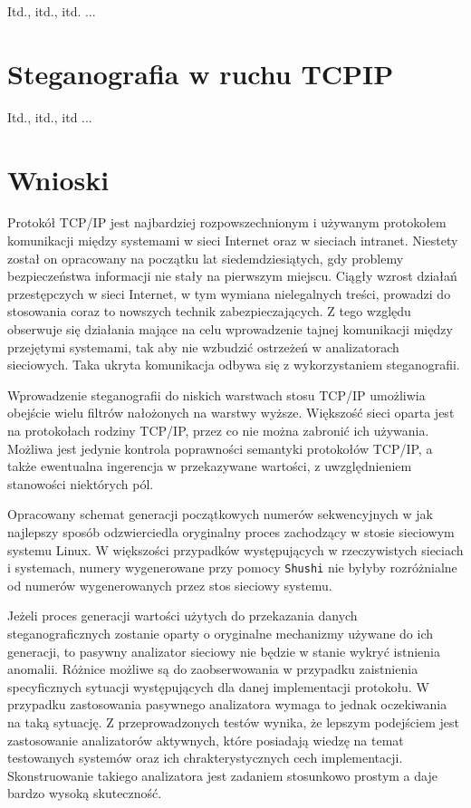 \documentclass[a4paper,12pt,twoside,openany]{report}
\newcommand{\tech}{\texttt}
\begin{document}
Itd., itd., itd. ...

\chapter{Steganografia w ruchu TCPIP}
\label{chapterSteganografiaWRuchuTCPIP}

Itd., itd., itd ...

\chapter{Wnioski}

Protokół TCP/IP jest najbardziej rozpowszechnionym i używanym protokołem 
komunikacji między systemami w sieci Internet oraz w sieciach intranet. Niestety 
został on opracowany na początku lat siedemdziesiątych, gdy problemy 
bezpieczeństwa informacji nie stały na pierwszym miejscu. Ciągły wzrost działań 
przestępczych w sieci Internet, w tym wymiana nielegalnych treści, prowadzi do 
stosowania coraz to nowszych technik zabezpieczających. Z tego względu obserwuje 
się działania mające na celu wprowadzenie tajnej komunikacji między przejętymi 
systemami, tak aby nie wzbudzić ostrzeżeń w analizatorach sieciowych. Taka 
ukryta komunikacja odbywa się z wykorzystaniem steganografii.

Wprowadzenie steganografii do niskich warstwach stosu TCP/IP umożliwia obejście 
wielu filtrów nałożonych na warstwy wyższe. Większość sieci oparta jest na 
protokołach rodziny TCP/IP, przez co nie można zabronić ich używania. Możliwa 
jest jedynie kontrola poprawności semantyki protokołów TCP/IP, a także 
ewentualna ingerencja w przekazywane wartości, z uwzględnieniem stanowości 
niektórych pól.

Opracowany schemat generacji początkowych numerów sekwencyjnych w jak najlepszy 
sposób odzwierciedla oryginalny proces zachodzący w stosie sieciowym systemu 
Linux. W większości przypadków występujących w rzeczywistych sieciach i 
systemach, numery wygenerowane przy pomocy \tech{Shushi} nie byłyby rozróżnialne 
od numerów wygenerowanych przez stos sieciowy systemu.

Jeżeli proces generacji wartości użytych do przekazania danych 
steganograficznych zostanie oparty o oryginalne mechanizmy używane do ich 
generacji, to pasywny analizator sieciowy nie będzie w stanie wykryć istnienia 
anomalii. Różnice możliwe są do zaobserwowania w przypadku zaistnienia 
specyficznych sytuacji występujących dla danej implementacji protokołu. W 
przypadku zastosowania pasywnego analizatora wymaga to jednak oczekiwania na 
taką sytuację. Z przeprowadzonych testów wynika, że lepszym podejściem jest 
zastosowanie analizatorów aktywnych, które posiadają wiedzę na temat testowanych 
systemów oraz ich chrakterystycznych cech implementacji. Skonstruowanie takiego 
analizatora jest zadaniem stosunkowo prostym a daje bardzo wysoką skuteczność.
\end{document}
